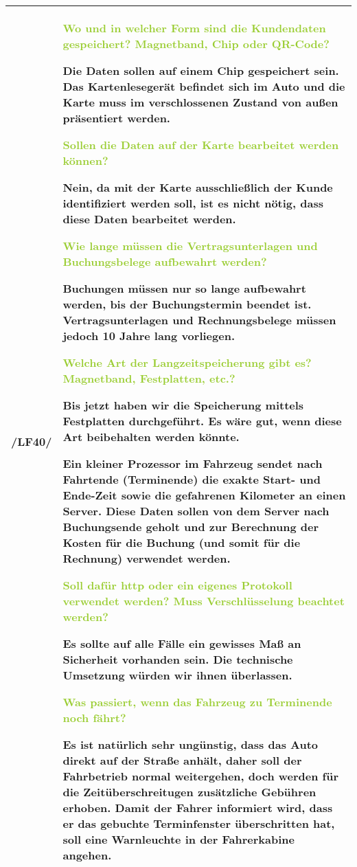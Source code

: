 \begin{tabular}{l | p{13cm}}
    \hline
    /LF40/ & \textcolor{YellowGreen}{Wo und in welcher Form sind die Kundendaten gespeichert? Magnetband, Chip oder QR-Code?}

    \textcolor{NavyBlue}{Die Daten sollen auf einem Chip gespeichert sein. Das Kartenlesegerät befindet sich im Auto und die Karte muss im verschlossenen Zustand von außen präsentiert werden.} 

    \textcolor{YellowGreen}{Sollen die Daten auf der Karte bearbeitet werden können?}

    \textcolor{NavyBlue}{Nein, da mit der Karte ausschließlich der Kunde identifiziert werden soll, ist es nicht nötig, dass diese Daten bearbeitet werden.}

    \textcolor{YellowGreen}{Wie lange müssen die Vertragsunterlagen und Buchungsbelege aufbewahrt werden?}

    \textcolor{NavyBlue}{Buchungen müssen nur so lange aufbewahrt werden, bis der Buchungstermin beendet ist. Vertragsunterlagen und Rechnungsbelege müssen jedoch 10 Jahre lang vorliegen.}

    \textcolor{YellowGreen}{Welche Art der Langzeitspeicherung gibt es? Magnetband, Festplatten, etc.?}

    \textcolor{NavyBlue}{Bis jetzt haben wir die Speicherung mittels Festplatten durchgeführt. Es wäre gut, wenn diese Art beibehalten werden könnte.}

    Ein kleiner Prozessor im Fahrzeug sendet nach Fahrtende (Terminende) die exakte Start- und Ende-Zeit sowie die gefahrenen Kilometer an einen Server. Diese Daten sollen von dem Server nach Buchungsende geholt und zur Berechnung der Kosten für die Buchung (und somit für die Rechnung) verwendet werden. 
    
    \textcolor{YellowGreen}{Soll dafür http oder ein eigenes Protokoll verwendet werden? Muss Verschlüsselung beachtet werden?}

    \textcolor{NavyBlue}{Es sollte auf alle Fälle ein gewisses Maß an Sicherheit vorhanden sein. Die technische Umsetzung würden wir ihnen überlassen.}

    \textcolor{YellowGreen}{Was passiert, wenn das Fahrzeug zu Terminende noch fährt?}

    \textcolor{NavyBlue}{Es ist natürlich sehr ungünstig, dass das Auto direkt auf der Straße anhält, daher soll der Fahrbetrieb normal weitergehen, doch werden für die Zeitüberschreitugen zusätzliche Gebühren erhoben. Damit der Fahrer informiert wird, dass er das gebuchte Terminfenster überschritten hat, soll eine Warnleuchte in der Fahrerkabine angehen.}
    \\
    \hline
\end{tabular}

